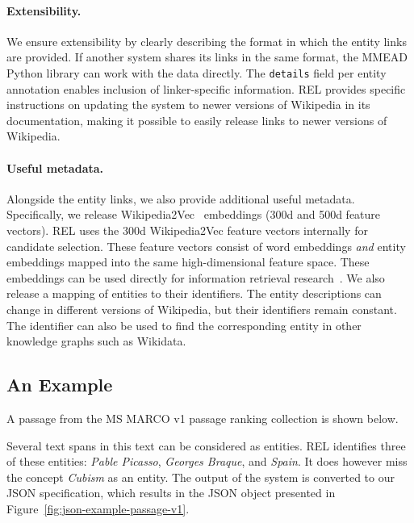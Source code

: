 \paragraph{Extensibility.} We ensure extensibility by clearly describing the format in which the entity links are provided. If another system shares its links in the same format, the MMEAD Python library can work with the data directly. The \texttt{details} field per entity annotation enables inclusion of linker-specific information. REL provides specific instructions on updating the system to newer versions of Wikipedia in its documentation, making it possible to easily release links to newer versions of Wikipedia.

\paragraph{Useful metadata.} Alongside the entity links, we also provide additional useful metadata. Specifically, we release Wikipedia2Vec~\citep{wikipedia2vec} embeddings (300d and 500d feature vectors). REL uses the 300d Wikipedia2Vec feature vectors internally for candidate selection. These feature vectors consist of word embeddings \emph{and} entity embeddings mapped into the same high-dimensional feature space. These embeddings can be used directly for information retrieval research~\citep{Gerritse:2020:GEER, Gerritse:2022:EMBERT}. We also release a mapping of entities to their identifiers. The entity descriptions can change in different versions of Wikipedia, but their identifiers remain constant.
The identifier can also be used to find the corresponding entity in other knowledge graphs such as Wikidata.

\subsection{An Example}
A passage from the MS MARCO v1 passage ranking collection is shown below.

\begin{center}
\end{center}

Several text spans in this text can be considered as entities. REL identifies three of these entities: \emph{Pable Picasso}, \emph{Georges Braque}, and \emph{Spain}. It does however miss the concept \emph{Cubism} as an entity.  
The output of the system is converted to our JSON specification, which results in the JSON object presented in Figure~\ref{fig:json-example-passage-v1}.

